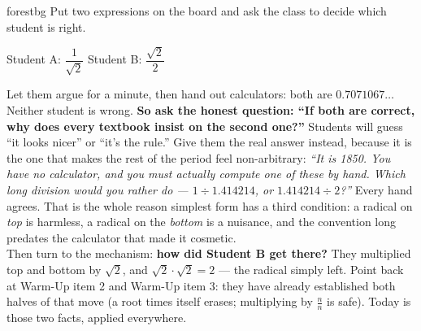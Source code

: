\documentclass[10pt]{article}
\begin{document}
\begin{skillbox}[Hook]{forestbg}
    Put two expressions on the board and ask the class to decide which student is right.
    \begin{center}
    Student A: \; $\dfrac{1}{\sqrt2}$ \qquad\qquad Student B: \; $\dfrac{\sqrt2}{2}$
    \end{center}
    Let them argue for a minute, then hand out calculators: both are $0.7071067\ldots$ Neither
    student is wrong. \textbf{So ask the honest question: ``If both are correct, why does every
    textbook insist on the second one?''} Students will guess ``it looks nicer'' or ``it's the
    rule.'' Give them the real answer instead, because it is the one that makes the rest of the
    period feel non-arbitrary: \emph{``It is 1850. You have no calculator, and you must actually
    compute one of these by hand. Which long division would you rather do ---
    $1\div1.414214$, or $1.414214\div2$?''} Every hand agrees. That is the whole reason simplest
    form has a third condition: a radical on \emph{top} is harmless, a radical on the \emph{bottom}
    is a nuisance, and the convention long predates the calculator that made it cosmetic.
    \\[3pt]
    Then turn to the mechanism: \textbf{how did Student B get there?} They multiplied top and
    bottom by $\sqrt2$, and $\sqrt2\cdot\sqrt2=2$ --- the radical simply left. Point back at
    Warm-Up item 2 and Warm-Up item 3: they have already established both halves of that move
    (a root times itself erases; multiplying by $\frac{n}{n}$ is safe). Today is those two facts,
    applied everywhere.
\end{skillbox}
\end{document}
